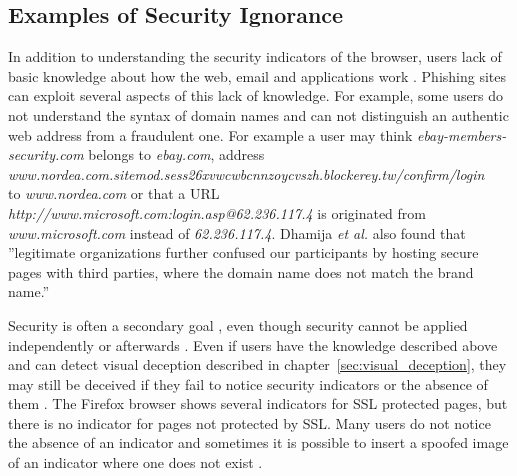 \documentclass[english,gradu]{tktltiki}
\begin{document}


\subsection{Examples of Security Ignorance} %
\label{sub:examples_of_security_ignorance}

              In addition to understanding the security indicators of the browser, users lack of basic knowledge about how the web, email and applications work \cite{why_phishing_works_06}. Phishing sites can exploit several aspects of this lack of knowledge. For example, some users do not understand the syntax of domain names and can not distinguish an authentic web address from a fraudulent one. For example a user may think
          \emph{ebay-members-security.com} belongs to \emph{ebay.com}, address \\
          \emph{www.nordea.com.sitemod.sess26xvwcwbcnnzoycvszh.blockerey.tw/confirm/login} \\
          to \emph{www.nordea.com} or that a URL \emph{http://www.microsoft.com:login.asp@62.236.117.4}
          is originated from \emph{www.microsoft.com} instead of \emph{62.236.117.4}.
          Dhamija \emph{et al.} \cite{why_phishing_works_06} also found that ''legitimate organizations further confused our participants by hosting secure pages with third parties, where the domain name does not match the brand name.''

              Security is often a secondary goal \cite{why_phishing_works_06}, even though security cannot be applied independently or afterwards \cite{schneier_secrets_and_lies_2000, lampson_distributed_1992}. Even if users have the knowledge described above and can detect visual deception described in chapter~\ref{sec:visual_deception}, they may still be deceived if they fail to notice security indicators or the absence of them \cite{why_phishing_works_06}. The Firefox browser shows several indicators for SSL protected pages, but there is no indicator for pages not protected by SSL. Many users do not notice the absence of an indicator and sometimes it is possible to insert a spoofed image of an indicator where one does not exist \cite{why_phishing_works_06}.
\end{document}

